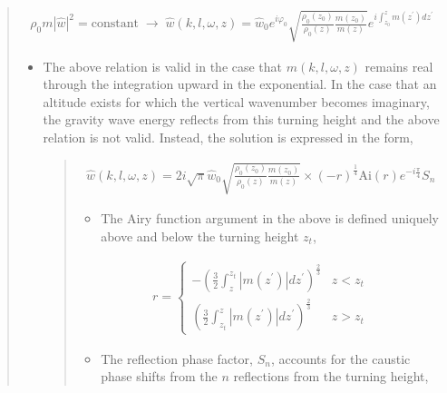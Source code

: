 \documentclass[letterpaper,10pt,english]{sphinxmanual}
\begin{document}
\begin{itemize}
\begin{quote}
\begin{itemize}
\end{itemize}
\begin{equation*}
\begin{split}\rho_0 m \left| \hat{w} \right|^2 = \text{constant} \; \rightarrow \;
\hat{w} \left( k, l, \omega, z \right) = \hat{w}_0 e^{i \varphi_0} \sqrt{ \frac{\rho_0 \left( z_0 \right)}{\rho_0 \left( z \right)} \frac{m \left( z_0 \right)}{m \left( z \right)}} e^{i \int_{z_0}^z{m \left( z^\prime \right) dz^\prime}}\end{split}
\end{equation*}\begin{itemize}
\item {} 
The above relation is valid in the case that \(m \left( k, l, \omega, z \right)\) remains real through the integration upward in the exponential.  In the case that an altitude exists for which the vertical wavenumber becomes imaginary, the gravity wave energy reflects from this turning height and the above relation is not valid.  Instead, the solution is expressed in the form,
\begin{quote}
\begin{equation*}
\begin{split}\hat{w} \left( k, l, \omega, z \right) = 2 i \sqrt{\pi} \hat{w}_0 \sqrt{ \frac{\rho_0 \left( z_0 \right)}{\rho_0 \left( z \right)} \frac{m \left( z_0 \right)}{m \left( z \right)}} \times \left( - r \right)^\frac{1}{4} \text{Ai} \left( r \right) e^{-i \frac{\pi}{4}} S_n\end{split}
\end{equation*}\begin{itemize}
\item {} 
The Airy function argument in the above is defined uniquely above and below the turning height \(z_t\),

\end{itemize}
\begin{equation*}
\begin{split}r = \left\{ \begin{matrix} - \left( \frac{3}{2} \int_z^{z_t} \left| m \left( z^\prime \right) \right| dz^\prime \right)^\frac{2}{3} & z < z_t \\ \left( \frac{3}{2} \int_{z_t}^z \left| m \left( z^\prime \right) \right| dz^\prime \right)^\frac{2}{3} & z > z_t \end{matrix} \right.\end{split}
\end{equation*}\begin{itemize}
\item {} 
The reflection phase factor, \(S_n\), accounts for the caustic phase shifts from the \(n\) reflections from the turning height,


\end{itemize}
\end{quote}
\end{itemize}
\end{quote}
\end{itemize}
\end{document}
